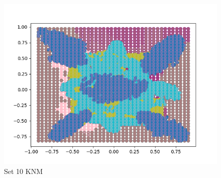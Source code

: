 \documentclass{article}
\begin{document}
\begin{figure}[H]
\begin{minipage}{.33\textwidth}
			\includegraphics[width=1\linewidth]{../set10KNMdecisions.png}
			\caption{Set 10 KNM}
	\end{minipage}\hfill
\end{figure}
\end{document}
